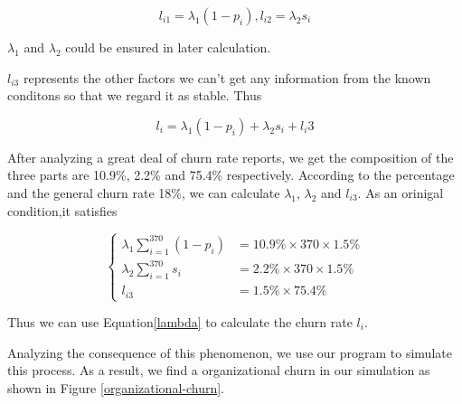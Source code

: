 \documentclass[12pt,a4paper,titlepage]{article}
\begin{document}
\begin{equation}
  l_{i1}=\lambda_1(1-p_i),l_{i2}=\lambda_2s_i
\end{equation}

$\lambda_1$ and $\lambda_2$ could be ensured in later calculation.

$l_{i3}$ represents the other factors we can't get any information from
the known conditons so that we regard it as stable.  Thus

\begin{equation}
  l_i = \lambda_1(1-p_i) + \lambda_2s_i +l_i3
\end{equation}

After analyzing a great deal of churn rate reports, we get the
composition of the three parts are 10.9\%, 2.2\% and 75.4\%
respectively. According to the percentage and the general
churn rate 18\%, we can calculate $\lambda_1$, $\lambda_2$ and
$l_{i3}$. As an orinigal condition,it satisfies

\begin{equation}
\label{lambda}
\begin{cases}
  \lambda_1 \sum_{i=1}^{370}(1-p_i) & =10.9\% \times 370 \times 1.5\% \\
  \lambda_2 \sum_{i=1}^{370}s_i & =2.2\% \times 370 \times 1.5\% \\
  l_{i3} & =1.5 \% \times 75.4 \%
\end{cases}
\end{equation}

Thus we can use Equation\ref{lambda} to calculate the churn rate $l_i$.

Analyzing the consequence of this phenomenon, we use our program to
simulate this process. As a result, we find a organizational churn in
our simulation as shown in Figure \ref{organizational-churn}.
\end{document}
